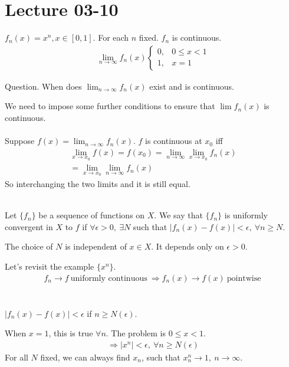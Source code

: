 \documentclass[class=scrartcl, crop=false]{standalone}
\date{2020-03-10}
\begin{document}
\section{Lecture 03-10}

\begin{example}
  $f_n(x) = x^n, x \in [0, 1]$. For each $n$ fixed. $f_n$ is continuous.
  \begin{gather*}
    \lim_{n \to \infty}f_n(x)
    \begin{cases}
      0, & 0 \leq x < 1 \\
      1, & x = 1
    \end{cases} 
  \end{gather*} 
\end{example} 

Question. When does $\lim_{n \to \infty}f_n(x)$ exist and is continuous.

We need to impose some further conditions to ensure that $\lim f_n(x)$ is continuous.
\\\\
Suppose $f(x) = \lim_{n \to \infty}f_n(x)$. $f$ is continuous at $x_0$ iff
\begin{gather*}
  \lim_{x \to x_0}f(x) = f(x_0) = \lim_{n \to \infty}\lim_{x \to x_0}f_n(x) \\
  = \lim_{x \to x_0}\lim_{n \to \infty} f_n(x)
\end{gather*} 
So interchanging the two limits and it is still equal.
\\\\
\begin{definition}
  Let $\{f_n\}$ be a sequence of functions on $X$. We say that $\{f_n\}$ is uniformly convergent in $X$ to $f$ if $\forall \epsilon > 0, \ \exists N$ such that $|f_n(x) - f(x)| < \epsilon, \ \forall n \geq N$.
  \begin{note}
    The choice of $N$ is independent of $x \in X$. It depends only on $\epsilon > 0$.
  \end{note} 
\end{definition} 

\begin{example}
  Let's revisit the example $\{x^n\}$. 
  \begin{gather*}
    f_n \to f \ \text{uniformly continuous} \ \Rightarrow f_n(x) \to f(x) \ \text{pointwise} \ 
  \end{gather*} 
  \\\\
  $|f_n(x) - f(x)| < \epsilon$ if $n \geq N(\epsilon)$.
  \begin{enumerate}
    \ii
    When $x = 1$, this is true $\forall n$.
    \ii
    The problem is $0 \leq x < 1$.
    \begin{gather*}
      \Rightarrow |x^n| < \epsilon, \ \forall n \geq N(\epsilon)
    \end{gather*} 
    For all $N$ fixed, we can always find $x_n$, such that $x_n^n \to 1, \ n \to \infty$.
  \end{enumerate}
\end{example} 
\end{document}
